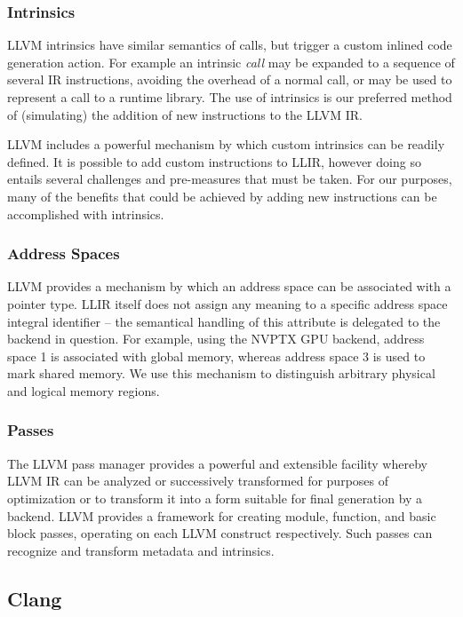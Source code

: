 \documentclass[12pt]{article}
\begin{document}
\subsubsection{Intrinsics}

LLVM intrinsics have similar semantics of calls, but trigger a custom inlined code generation action. For example an intrinsic {\it call} may be expanded to a sequence of several IR instructions, avoiding the overhead of a normal call, or may be used to represent a call to a runtime library. The use of intrinsics is our preferred method of (simulating) the addition of new instructions to the LLVM IR.

LLVM includes a powerful mechanism by which custom intrinsics can be readily defined. It is possible to add custom instructions to LLIR, however doing so entails several challenges and pre-measures that must be taken. For our purposes, many of the benefits that could be achieved by adding new instructions can be accomplished with intrinsics.

\subsubsection{Address Spaces}

LLVM provides a mechanism by which an address space can be associated with a pointer type. LLIR itself does not assign any meaning to a specific address space integral identifier -- the semantical handling of this attribute is delegated to the backend in question. For example, using the NVPTX GPU backend, address space 1 is associated with global memory, whereas address space 3 is used to mark shared memory. We use this mechanism to distinguish arbitrary physical and logical memory regions.

\subsubsection{Passes}

The LLVM pass manager provides a powerful and extensible facility whereby LLVM IR can be analyzed or successively transformed for purposes of optimization or to transform it into a form suitable for final generation by a backend. LLVM provides a framework for creating module, function, and basic block passes, operating on each LLVM construct respectively. Such passes can recognize and transform metadata and intrinsics.

\subsection{Clang}
\end{document}
